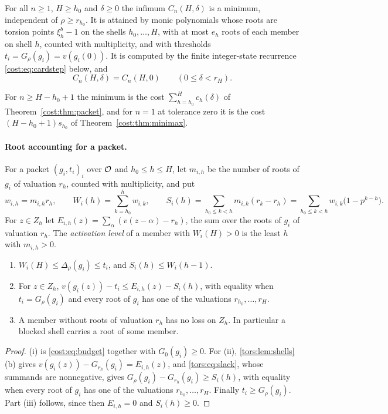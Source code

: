 \begin{theorem}\label{cost:thm:cardfinite}
For all $n\ge1$, $H\ge h_0$ and $\delta\ge0$ the infimum $C_n(H,\delta)$ is a minimum,
independent of $\rho\ge r_{h_0}$. It is attained by monic polynomials whose roots are torsion
points $\xi_h^b-1$ on the shells $h_0,\dots,H$, with at most $e_h$ roots of each member on
shell $h$, counted with multiplicity, and with thresholds $t_i=G_\rho(g_i)=v(g_i(0))$. It is
computed by the finite integer-state recurrence \eqref{cost:eq:cardstep} below, and
\[
 C_n(H,\delta)=C_n(H,0)\qquad(0\le\delta<r_H).
\]
\end{theorem}

For $n\ge H-h_0+1$ the minimum is the cost $\sum_{h=h_0}^Hc_h(\delta)$ of
Theorem~\ref{cost:thm:packet}, and for $n=1$ at tolerance zero it is the cost
$(H-h_0+1)s_{h_0}$ of Theorem~\ref{cost:thm:minimax}.

\paragraph{Root accounting for a packet.}
For a packet $(g_i,t_i)_i$ over $\mathcal{O}$ and $h_0\le h\le H$, let $m_{i,h}$ be the number of
roots of $g_i$ of valuation $r_h$, counted with multiplicity, and put
\[
 w_{i,h}=m_{i,h}r_h,\qquad W_i(h)=\sum_{k=h_0}^hw_{i,k},\qquad
 S_i(h)=\sum_{h_0\le k<h}m_{i,k}(r_k-r_h)=\sum_{h_0\le k<h}w_{i,k}\bigl(1-p^{k-h}\bigr).
\]
For $z\in Z_h$ let $E_{i,h}(z)=\sum_\alpha(v(z-\alpha)-r_h)$, the sum over the roots of $g_i$
of valuation $r_h$. The \emph{activation level} of a member with $W_i(H)>0$ is the least $h$
with $m_{i,h}>0$.

\begin{lemma}\label{cost:lem:cardmodel}
\leavevmode
\begin{enumerate}[label=\textup{(\roman*)}]
\item $W_i(H)\le\Delta_\rho(g_i)\le t_i$, and $S_i(h)\le W_i(h-1)$.
\item For $z\in Z_h$, $v(g_i(z))-t_i\le E_{i,h}(z)-S_i(h)$, with equality when
$t_i=G_\rho(g_i)$ and every root of $g_i$ has one of the valuations
$r_{h_0},\dots,r_H$.
\item A member without roots of valuation $r_h$ has no loss on $Z_h$. In particular a
blocked shell carries a root of some member.
\end{enumerate}
\end{lemma}

\begin{proof}
(i) is \eqref{cost:eq:budget} together with $G_0(g_i)\ge0$. For (ii),
\cref{tors:lem:shells}(b) gives $v(g_i(z))-G_{r_h}(g_i)=E_{i,h}(z)$, and
\eqref{tors:eq:slack}, whose summands are nonnegative, gives
$G_\rho(g_i)-G_{r_h}(g_i)\ge S_i(h)$, with equality when every root of $g_i$ has one of the
valuations $r_{h_0},\dots,r_H$. Finally $t_i\ge G_\rho(g_i)$. Part (iii)
follows, since then $E_{i,h}=0$ and $S_i(h)\ge0$.
\end{proof}

